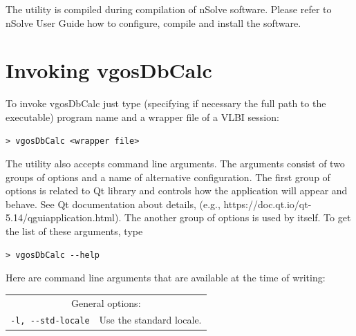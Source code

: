 \documentclass [10pt,letterpaper]{report}
\newcommand{\nuSolve}{\greektext n\latintext Solve}
\begin{document}
The utility is compiled during compilation of \nuSolve{} software. Please
refer to \nuSolve{} User Guide how to configure, compile and install the
software.

%
%





%
%
\chapter{Invoking vgosDbCalc}
\label{chapter_invokation}
To invoke vgosDbCalc just type (specifying if necessary the full path
to the executable) program name and a wrapper file of a VLBI session:
\begin{verbatim}
> vgosDbCalc <wrapper file>
\end{verbatim}
\noindent
The utility also accepts command line arguments. The arguments consist of
two groups of options and a name of alternative configuration. The first
group of options is related to Qt library and controls how the application
will appear and behave. See Qt documentation about details, (e.g.,
https://doc.qt.io/qt-5.14/qguiapplication.html).
The another group of options is used by itself. To get the list
of these arguments, type

\begin{verbatim}
> vgosDbCalc --help
\end{verbatim}
\noindent
Here are command line arguments that are available at the time of writing:
\vspace{5mm}

\begin{tabular}{p{\leftSp}p{\riteSp}}
\multicolumn{2}{c}{General options:}\\
{\tt -l, -{}-std-locale}        & Use the standard locale.\\
\end{tabular}
\vspace{5mm}
\end{document}
